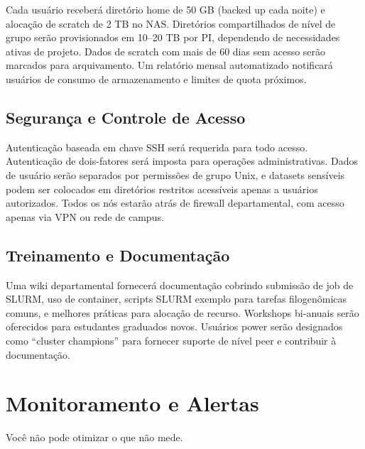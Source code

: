 Cada usuário receberá diretório home de 50 GB (backed up cada noite) e alocação de scratch de 2 TB no NAS. Diretórios compartilhados de nível de grupo serão provisionados em 10--20 TB por PI, dependendo de necessidades ativas de projeto. Dados de scratch com mais de 60 dias sem acesso serão marcados para arquivamento. Um relatório mensal automatizado notificará usuários de consumo de armazenamento e limites de quota próximos.

\subsection{Segurança e Controle de Acesso}

Autenticação baseada em chave SSH será requerida para todo acesso. Autenticação de dois-fatores será imposta para operações administrativas. Dados de usuário serão separados por permissões de grupo Unix, e datasets sensíveis podem ser colocados em diretórios restritos acessíveis apenas a usuários autorizados. Todos os nós estarão atrás de firewall departamental, com acesso apenas via VPN ou rede de campus.

\subsection{Treinamento e Documentação}

Uma wiki departamental fornecerá documentação cobrindo submissão de job de SLURM, uso de container, scripts SLURM exemplo para tarefas filogenômicas comuns, e melhores práticas para alocação de recurso. Workshops bi-anuais serão oferecidos para estudantes graduados novos. Usuários power serão designados como ``cluster champions'' para fornecer suporte de nível peer e contribuir à documentação.

\section{Monitoramento e Alertas}

Você não pode otimizar o que não mede.

